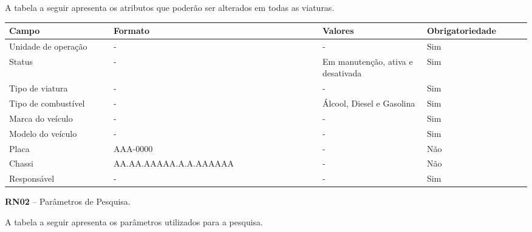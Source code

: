  A tabela a seguir apresenta os atributos que poderão ser alterados em todas as viaturas.
 
   \begin{table*}[!h]
    \centering
      \begin{tabular}{|p{0.20\linewidth}|p{0.4\linewidth}|p{0.20\linewidth}|p{0.20\linewidth}|}
      \hline
      Campo  & Formato & Valores & Obrigatoriedade\\


  \hline                               
  Unidade de operação & - & - & Sim\\

  \hline                               
  Status & - & Em manutenção, ativa e desativada & Sim\\
  
  \hline                               
  Tipo de viatura & - & - & Sim\\
  
  \hline                               
  Tipo de combustível & - & Álcool, Diesel e Gasolina & Sim\\
  
  \hline                               
  Marca do veículo & - & - & Sim\\
  
  \hline                               
  Modelo do veículo & - & - & Sim\\
  
  \hline                               
  Placa & AAA-0000 & - & Não\\
  
  \hline                               
  Chassi & AA.AA.AAAAA.A.A.AAAAAA & - & Não\\
  
  \hline                               
  Responsável & - & - & Sim\\  
  
  \hline  
      
      \end{tabular}
    \end{table*}

    
      \textbf{RN02} – Parâmetros de Pesquisa.
   
A tabela a seguir apresenta os parâmetros utilizados para a pesquisa.

